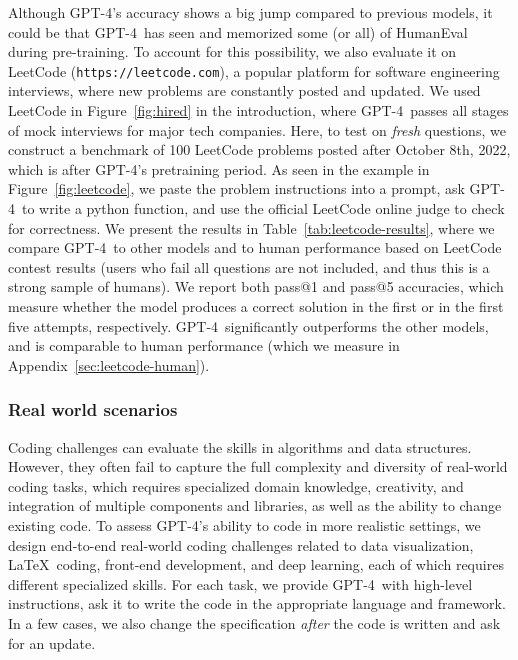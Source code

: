 Although {GPT-4}'s accuracy shows a big jump compared to previous models, it could be that GPT-4\ has seen and memorized some (or all) of HumanEval during pre-training. To account for this possibility, we also evaluate it on LeetCode (\texttt{https://leetcode.com}), a popular platform for software engineering interviews, where new problems are constantly posted and updated. We used LeetCode in Figure~\ref{fig:hired} in the introduction, where GPT-4\ passes all stages of mock interviews for major tech companies. Here, to test on \emph{fresh} questions, we construct a benchmark of 100 LeetCode problems posted after October 8th, 2022, which is after GPT-4's pretraining period. As seen in the example in Figure~\ref{fig:leetcode}, we paste the problem instructions into a prompt, ask GPT-4\ to write a python function, and use the official LeetCode online judge to check for correctness. We present the results in Table~\ref{tab:leetcode-results}, where we compare GPT-4\ to other models and to human performance based on LeetCode contest results (users who fail all questions are not included, and thus this is a strong sample of humans). We report both pass@1 and pass@5 accuracies, which measure whether the model produces a correct solution in the first or in the first five attempts, respectively. 
GPT-4\ significantly outperforms the other models, and is comparable to human performance (which we measure in Appendix~\ref{sec:leetcode-human}).

\subsubsection{Real world scenarios} Coding challenges can evaluate the skills in algorithms and data structures. However, they often fail to capture the full complexity and diversity of real-world coding tasks, which requires specialized domain knowledge, creativity, and integration of multiple components and libraries, as well as the ability to change existing code. To assess GPT-4's ability to code in more realistic settings, we design end-to-end real-world coding challenges related to data visualization, \LaTeX\ coding, front-end development, and deep learning, each of which requires different specialized skills. For each task, we provide GPT-4\ with high-level instructions, ask it to write the code in the appropriate language and framework. In a few cases, we also change the specification \emph{after} the code is written and ask for an update.

